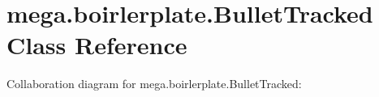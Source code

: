\hypertarget{classmega_1_1boirlerplate_1_1_bullet_tracked}{}\section{mega.\+boirlerplate.\+Bullet\+Tracked Class Reference}
\label{classmega_1_1boirlerplate_1_1_bullet_tracked}


Collaboration diagram for mega.\+boirlerplate.\+Bullet\+Tracked\+:
